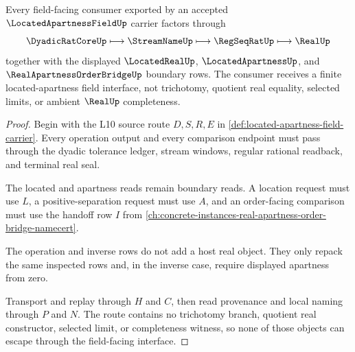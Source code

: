 \begin{theorem}
\label{thm:located-apartness-field-real-nonescape}
Every field-facing consumer exported by an accepted $\LocatedApartnessFieldUp$ carrier factors through
$$
\DyadicRatCoreUp \longmapsto \StreamNameUp \longmapsto \RegSeqRatUp \longmapsto \RealUp
$$
together with the displayed $\LocatedRealUp$, $\LocatedApartnessUp$, and $\RealApartnessOrderBridgeUp$ boundary rows. The consumer receives a finite located-apartness field interface, not trichotomy, quotient real equality, selected limits, or ambient $\RealUp$ completeness.
\end{theorem}
\begin{proof}
Begin with the L10 source route $D,S,R,E$ in \autoref{def:located-apartness-field-carrier}. Every operation output and every comparison endpoint must pass through the dyadic tolerance ledger, stream windows, regular rational readback, and terminal real seal.

The located and apartness reads remain boundary reads. A location request must use $L$, a positive-separation request must use $A$, and an order-facing comparison must use the handoff row $I$ from \autoref{ch:concrete-instances-real-apartness-order-bridge-namecert}.

The operation and inverse rows do not add a host real object. They only repack the same inspected rows and, in the inverse case, require displayed apartness from zero.

Transport and replay through $H$ and $C$, then read provenance and local naming through $P$ and $N$. The route contains no trichotomy branch, quotient real constructor, selected limit, or completeness witness, so none of those objects can escape through the field-facing interface.
\end{proof}



